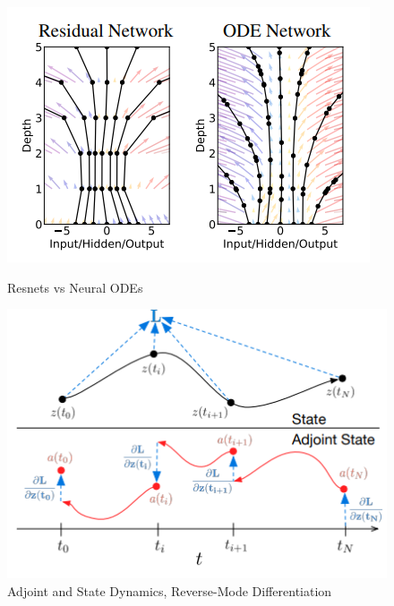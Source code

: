 \documentclass[12pt]{article}
\begin{document}
\begin{figure}[ht]
    \centering
    \begin{minipage}{0.45\textwidth}
        \centering
        \includegraphics[width=\textwidth]{1.png}
        \caption{Resnets vs Neural ODEs}
        \label{fig:1}
    \end{minipage}\hfill
    \begin{minipage}{0.45\textwidth}
        \centering
        \includegraphics[width=\textwidth]{2.png}
        \caption{Adjoint and State Dynamics, Reverse-Mode Differentiation}
        \label{fig:2}
    \end{minipage}
\end{figure}
\end{document}
